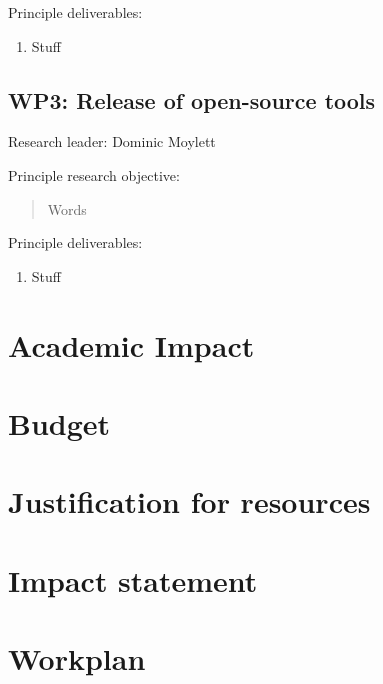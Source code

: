 \documentclass[a4paper,11pt]{article}
\begin{document}
    Principle deliverables:
    \begin{enumerate}
        \item Stuff
    \end{enumerate}

    \subsection*{WP3: Release of open-source tools}

    Research leader: Dominic Moylett

    Principle research objective:
    \begin{quote}
        Words
    \end{quote}

    Principle deliverables:
    \begin{enumerate}
        \item Stuff
    \end{enumerate}

    \section{Academic Impact}

    

    \newpage
    \section{Budget}

    \newpage
    \section{Justification for resources}

    \newpage
    \section{Impact statement}

    \newpage
    \section{Workplan}
\end{document}
